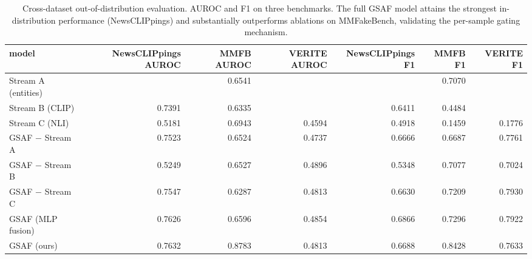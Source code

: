 \begin{table}[!t]
\centering
\caption{Cross-dataset out-of-distribution evaluation. AUROC and F1 on three benchmarks. The full GSAF model attains the strongest in-distribution performance (NewsCLIPpings) and substantially outperforms ablations on MMFakeBench, validating the per-sample gating mechanism.}
\label{tab:cross_dataset}
\begin{tabular}{lrrrrrr}
\toprule
\textbf{model} & \textbf{NewsCLIPpings AUROC} & \textbf{MMFB AUROC} & \textbf{VERITE AUROC} & \textbf{NewsCLIPpings F1} & \textbf{MMFB F1} & \textbf{VERITE F1} \\
\midrule
Stream A (entities) &  & 0.6541 &  &  & 0.7070 &  \\
Stream B (CLIP) & 0.7391 & 0.6335 &  & 0.6411 & 0.4484 &  \\
Stream C (NLI) & 0.5181 & 0.6943 & 0.4594 & 0.4918 & 0.1459 & 0.1776 \\
GSAF − Stream A & 0.7523 & 0.6524 & 0.4737 & 0.6666 & 0.6687 & 0.7761 \\
GSAF − Stream B & 0.5249 & 0.6527 & 0.4896 & 0.5348 & 0.7077 & 0.7024 \\
GSAF − Stream C & 0.7547 & 0.6287 & 0.4813 & 0.6630 & 0.7209 & 0.7930 \\
GSAF (MLP fusion) & 0.7626 & 0.6596 & 0.4854 & 0.6866 & 0.7296 & 0.7922 \\
GSAF (ours) & 0.7632 & 0.8783 & 0.4813 & 0.6688 & 0.8428 & 0.7633 \\
\bottomrule
\end{tabular}
\end{table}
